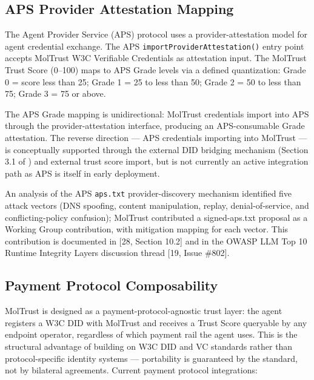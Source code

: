 \subsection{APS Provider Attestation Mapping}

The Agent Provider Service (APS) protocol uses a provider-attestation model for agent credential exchange. The APS \texttt{importProviderAttestation()} entry point accepts MolTrust W3C Verifiable Credentials as attestation input. The MolTrust Trust Score (0–100) maps to APS Grade levels via a defined quantization: Grade 0 = score less than 25; Grade 1 = 25 to less than 50; Grade 2 = 50 to less than 75; Grade 3 = 75 or above.


The APS Grade mapping is unidirectional: MolTrust credentials import into APS through the provider-attestation interface, producing an APS-consumable Grade attestation. The reverse direction — APS credentials importing into MolTrust — is conceptually supported through the external DID bridging mechanism (Section 3.1 of \cite{ref28_techspec}) and external trust score import, but is not currently an active integration path as APS is itself in early deployment.


An analysis of the APS \texttt{aps.txt} provider-discovery mechanism identified five attack vectors (DNS spoofing, content manipulation, replay, denial-of-service, and conflicting-policy confusion); MolTrust contributed a signed-aps.txt proposal as a Working Group contribution, with mitigation mapping for each vector. This contribution is documented in [28, Section 10.2] and in the OWASP LLM Top 10 Runtime Integrity Layers discussion thread [19, Issue \#802].


\subsection{Payment Protocol Composability}

MolTrust is designed as a payment-protocol-agnostic trust layer: the agent registers a W3C DID with MolTrust and receives a Trust Score queryable by any endpoint operator, regardless of which payment rail the agent uses. This is the structural advantage of building on W3C DID and VC standards rather than protocol-specific identity systems — portability is guaranteed by the standard, not by bilateral agreements. Current payment protocol integrations:


